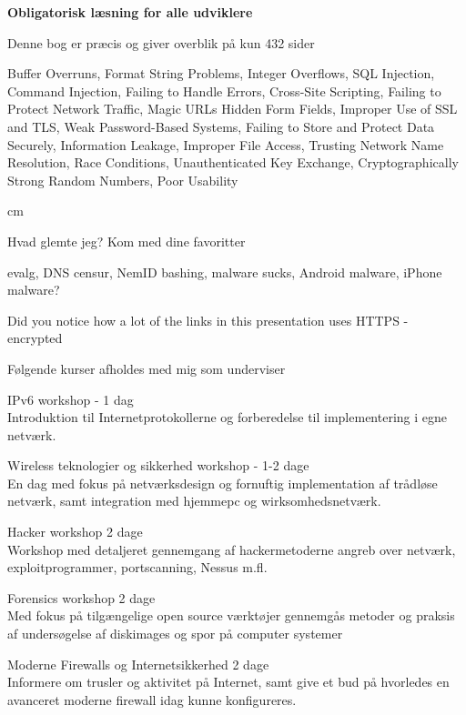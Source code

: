 \documentclass[20pt,landscape,a4paper,footrule]{foils}
\begin{document}
\begin{list1}
\item {\bf Obligatorisk læsning for alle udviklere}
\item Denne bog er præcis og giver overblik på kun 432 sider
\item Buffer Overruns, Format String Problems, Integer Overflows, SQL Injection, Command Injection,
Failing to Handle Errors, Cross-Site Scripting, Failing to Protect Network Traffic, Magic URLs Hidden Form Fields,
Improper Use of SSL and TLS, Weak Password-Based Systems, Failing to Store and Protect Data Securely, Information
Leakage, Improper File Access, Trusting Network Name Resolution, Race Conditions, Unauthenticated Key Exchange, Cryptographically Strong Random Numbers, Poor Usability 
\end{list1}



 cm

\centerline{\Large Hvad glemte jeg? Kom med dine favoritter \smiley}

evalg, DNS censur, NemID bashing, malware sucks, Android malware, iPhone malware?

Did you notice how a lot of the links in this presentation uses HTTPS - encrypted


\myquestionspage




\begin{list1}
\item Følgende kurser afholdes med mig som underviser
\begin{list2}
\item IPv6 workshop - 1 dag\\
 Introduktion til Internetprotokollerne og forberedelse til
  implementering i egne netværk. 
\item Wireless teknologier og sikkerhed workshop - 1-2 dage\\
En dag med fokus på netværksdesign og fornuftig implementation af
trådløse netværk, samt integration med hjemmepc og
wirksomhedsnetværk. 
\item Hacker workshop 2 dage\\
Workshop med detaljeret gennemgang af hackermetoderne angreb over
netværk, exploitprogrammer, portscanning, Nessus m.fl.
\item Forensics workshop 2 dage\\
Med fokus på tilgængelige open source værktøjer gennemgås metoder og
praksis af undersøgelse af diskimages og spor på computer systemer
\item Moderne Firewalls og Internetsikkerhed 2 dage\\
Informere om trusler og aktivitet på Internet, samt give et bud
på hvorledes en avanceret moderne firewall idag kunne konfigureres.
\end{list2}
\end{list1}
\end{document}
